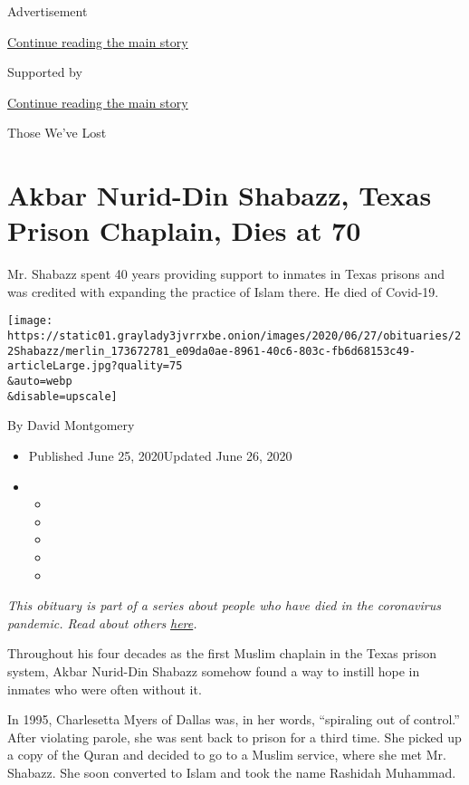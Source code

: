 Advertisement

\protect\hyperlink{after-top}{Continue reading the main story}

Supported by

\protect\hyperlink{after-sponsor}{Continue reading the main story}

Those We've Lost

\hypertarget{akbar-nurid-din-shabazz-texas-prison-chaplain-dies-at-70}{%
\section{Akbar Nurid-Din Shabazz, Texas Prison Chaplain, Dies at
70}\label{akbar-nurid-din-shabazz-texas-prison-chaplain-dies-at-70}}

Mr. Shabazz spent 40 years providing support to inmates in Texas prisons
and was credited with expanding the practice of Islam there. He died of
Covid-19.

\texttt{[image: https://static01.graylady3jvrrxbe.onion/images/2020/06/27/obituaries/22Shabazz/merlin\_173672781\_e09da0ae-8961-40c6-803c-fb6d68153c49-articleLarge.jpg?quality=75\\\&auto=webp\\\&disable=upscale]}

By David Montgomery

\begin{itemize}
\item
  Published June 25, 2020Updated June 26, 2020
\item
  \begin{itemize}
  \item
  \item
  \item
  \item
  \item
  \end{itemize}
\end{itemize}

\emph{This obituary is part of a series about people who have died in
the coronavirus pandemic. Read about others}
\href{https://www.nytimes3xbfgragh.onion/interactive/2020/obituaries/people-died-coronavirus-obituaries.html}{\emph{here}}\emph{.}

Throughout his four decades as the first Muslim chaplain in the Texas
prison system, Akbar Nurid-Din Shabazz somehow found a way to instill
hope in inmates who were often without it.

In 1995, Charlesetta Myers of Dallas was, in her words, ``spiraling out
of control.'' After violating parole, she was sent back to prison for a
third time. She picked up a copy of the Quran and decided to go to a
Muslim service, where she met Mr. Shabazz. She soon converted to Islam
and took the name Rashidah Muhammad.

